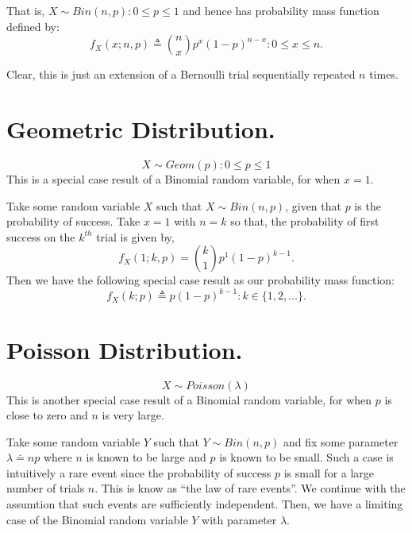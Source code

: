 \documentclass[10pt, oneside, reqno]{amsart}
\begin{document}
That is, $X \sim Bin(n, p) : 0 \leq p \leq 1$ and hence has probability mass function defined by:
\begin{equation}\label{eqn:binomial}
 \boxed{f_{X}(x; n, p) \triangleq {n \choose x} p^{x} (1 - p)^{n - x} : 0 \leq x \leq n.}
\end{equation}

Clear, this is just an extension of a Bernoulli trial sequentially repeated $n$ times.

\section{Geometric Distribution.}
\begin{equation}\label{eqn:geometricdist}
 \boxed{X \sim Geom(p) : 0 \leq p \leq 1}
\end{equation}
This is a special case result of a Binomial random variable, for when $x=1$.

Take some random variable $X$ such that $X \sim Bin(n, p)$, given that $p$ is the probability of success.
Take $x=1$ with $n=k$ so that, the probability of first success on the $k^{th}$ trial is given by,
\[
 f_{X}(1; k, p) = {k \choose 1} p^{1} (1 - p)^{k - 1}.
\]
Then we have the following special case result as our probability mass function:
\begin{equation}\label{eqn:geometric}
 \boxed{f_{X}(k; p) \triangleq p (1 - p)^{k - 1} : k \in \{1, 2, \dots\} .}
\end{equation}

\section{Poisson Distribution.}
\begin{equation}\label{eqn:poissondist}
 \boxed{X \sim Poisson(\lambda)}
\end{equation}
This is another special case result of a Binomial random variable, for when $p$ is close to zero and $n$ is very large\cite{Papoulis-1991}.

Take some random variable $Y$ such that $Y \sim Bin(n, p)$ and fix some parameter $\lambda \doteq n p$ where $n$ is known to be large and $p$ is known to be small.
Such a case is intuitively a rare event since the probability of success $p$ is small for a large number of trials $n$. This is know as ``the law of rare events''\cite{homepages/93/8114}.
We continue with the assumtion that such events are sufficiently independent. Then, we have a limiting case of the Binomial random variable $Y$ with parameter $\lambda$.
\end{document}
